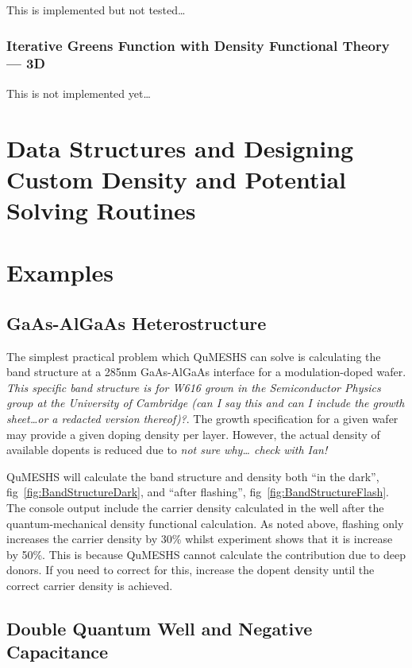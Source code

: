 \documentclass[12pt]{article}
\newcommand{\red}[1]{{\color{red} \it #1}}
\begin{document}
{This is implemented but not tested\ldots

\subsubsection{Iterative Greens Function with Density Functional Theory --- 3D}

This is not implemented yet\ldots


\section{Data Structures and Designing Custom Density and Potential Solving Routines}

\section{Examples}
\label{sec:Examples}

\subsection{GaAs-AlGaAs Heterostructure}
\label{subsec:SimpleBandStructure}

The simplest practical problem which QuMESHS can solve is calculating the
band structure at a 285nm GaAs-AlGaAs interface for a modulation-doped wafer.
\red{This specific band structure is for W616 grown in the Semiconductor Physics
group at the University of Cambridge (can I say this and can I include the
growth sheet\ldots or a redacted version thereof)?}.  The growth specification
for a given wafer may provide a given doping density per layer.  However,
the actual density of available dopents is reduced due to \red{not sure why\ldots
check with Ian!}

QuMESHS will calculate the band structure and density both ``in the dark'',
fig~\ref{fig:BandStructureDark}, and ``after flashing'',
fig~\ref{fig:BandStructureFlash}.  The console output include the carrier
density calculated in the well after the quantum-mechanical density
functional calculation.  As noted above, flashing only increases the carrier
density by 30\% whilst experiment shows that it is increase by 50\%.  This
is because QuMESHS cannot calculate the contribution due to deep donors.
If you need to correct for this, increase the dopent density until the
correct carrier density is achieved.


\subsection{Double Quantum Well and Negative Capacitance}
\label{subsec:NegativeCapacitance}

}
\end{document}
